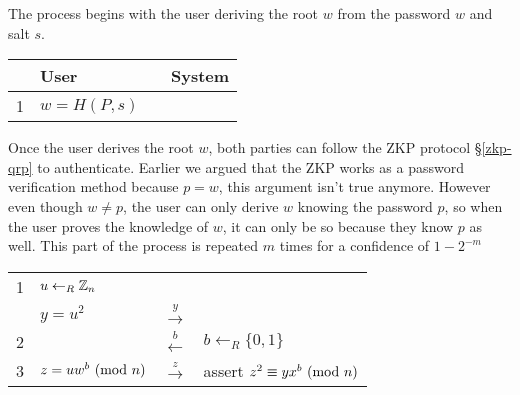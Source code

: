 \bigskip
\noindent
The process begins with the user deriving the root $w$ from the password $w$ and salt $s$.

\begin{table}[h!]
	\centering
	\begin{tabular}{p{}|p{}|p{}|p{}}
  		& User & & System\\
  		\hline
		1 & $w = H(P, s)$ & & \\ 
	\end{tabular}
\end{table}

\noindent
Once the user derives the root $w$, both parties can follow the ZKP protocol \S\ref{zkp-qrp} to authenticate.
Earlier we argued that the ZKP works as a password verification method because $p = w$, this argument isn't true anymore.
However even though $w \not = p$, the user can only derive $w$ knowing the password $p$, so when the user proves the knowledge of $w$, it can only be so because they know $p$ as well.
This part of the process is repeated $m$ times for a confidence of $1 - 2^{-m}$

\begin{table}[h!]
	\centering
	\begin{tabular}{p{}|p{}|p{}|p{}}
  		&  & & \\
		\hline
		1 & $u \leftarrow_R \Bbb{Z}_{n}$ &  \\
		& $y = u^2$ & $\xrightarrow{y}$ \\
		2 & & $\xleftarrow{b}$ & $b \leftarrow_R \{0, 1\} $ \\
		3 & $z = uw^b \ (\mathrm{mod}\ n) $ & $\xrightarrow{z}$ & assert $z^2 \equiv yx^b \ (\mathrm{mod}\ n)$\\ 
	\end{tabular}
\end{table}

